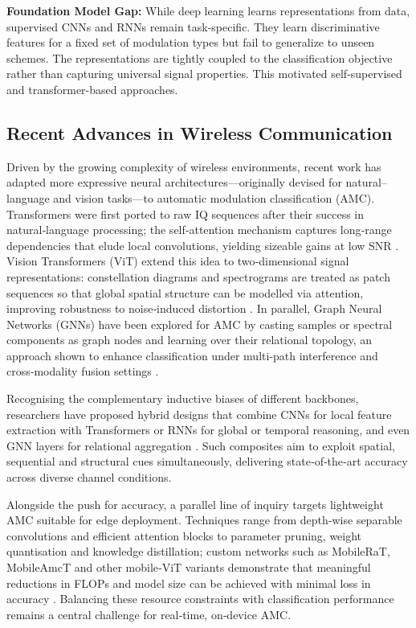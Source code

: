 \textbf{Foundation Model Gap:} While deep learning learns representations from data, supervised CNNs and RNNs remain task-specific. They learn discriminative features for a fixed set of modulation types but fail to generalize to unseen schemes. The representations are tightly coupled to the classification objective rather than capturing universal signal properties. This motivated self-supervised and transformer-based approaches.

\subsection{Recent Advances in Wireless Communication}\label{sec:recent}

Driven by the growing complexity of wireless environments, recent work has adapted more expressive neural architectures—originally devised for natural–language and vision tasks—to automatic modulation classification (AMC).  Transformers were first ported to raw IQ sequences after their success in natural‑language processing; the self‑attention mechanism captures long‑range dependencies that elude local convolutions, yielding sizeable gains at low SNR \cite{vaswani2017attention,damasevicius2024tfi}. Vision Transformers (ViT) extend this idea to two‑dimensional signal representations: constellation diagrams and spectrograms are treated as patch sequences so that global spatial structure can be modelled via attention, improving robustness to noise‑induced distortion \cite{dosovitskiy2021vit,shao2024iqformer}.  In parallel, Graph Neural Networks (GNNs) have been explored for AMC by casting samples or spectral components as graph nodes and learning over their relational topology, an approach shown to enhance classification under multi‑path interference and cross‑modality fusion settings \cite{liu2020gcn,marwani2024graph}.

Recognising the complementary inductive biases of different backbones, researchers have proposed hybrid designs that combine CNNs for local feature extraction with Transformers or RNNs for global or temporal reasoning, and even GNN layers for relational aggregation \cite{damasevicius2024tfi,chen2024survey}.  Such composites aim to exploit spatial, sequential and structural cues simultaneously, delivering state‑of‑the‑art accuracy across diverse channel conditions.

Alongside the push for accuracy, a parallel line of inquiry targets lightweight AMC suitable for edge deployment.  Techniques range from depth‑wise separable convolutions and efficient attention blocks to parameter pruning, weight quantisation and knowledge distillation; custom networks such as MobileRaT, MobileAmcT and other mobile‑ViT variants demonstrate that meaningful reductions in FLOPs and model size can be achieved with minimal loss in accuracy \cite{xuan2022avgnet,zheng2023mobilerat,fei2024mobileamct}.  Balancing these resource constraints with classification performance remains a central challenge for real‑time, on‑device AMC.

